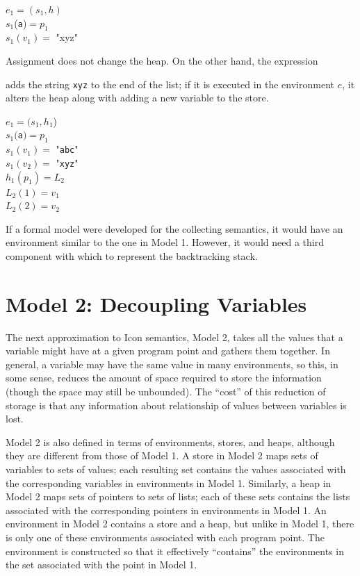 \goodbreak
\begin{iconcode}
\>$e_1 = (s_1 , h)$\\
\>$s_1$(\texttt{a})$ = p_1$\\
\>$s_1(v_1) =$ "xyz"\\
\end{iconcode}

\noindent
Assignment does not change the heap. On the other hand, the expression 


\noindent adds the string \texttt{xyz} to the end of the list; if it is
executed in the environment $e$, it alters the heap along with adding a
new variable to the store.

\goodbreak
\begin{specialcode}{}
\>$e_1 = (s_1 , h_1$)\\
\>$s_1($\texttt{a}$) = p_1$\\
\>$s_1(v_1) =$ "\texttt{abc}"\\
\>$s_1(v_2) =$ "\texttt{xyz}"\\
\>$h_1(p_1) = L_2$\\
\>$L_2(1) = v_1$\\
\>$L_2(2) = v_2$\\
\end{specialcode}


If a formal model were developed for the collecting semantics, it
would have an environment similar to the one in Model 1. However, it
would need a third component with which to represent the backtracking
stack.

\section*{Model 2: Decoupling Variables}

The next approximation to Icon semantics, Model 2, takes all the
values that a variable might have at a given program point and gathers
them together. In general, a variable may have the same value in many
environments, so this, in some sense, reduces the amount of space
required to store the information (though the space may still be
unbounded). The ``cost'' of this reduction of storage is that any
information about relationship of values between variables is lost.

Model 2 is also defined in terms of environments, stores, and heaps,
although they are different from those of Model 1.  A store in Model 2
maps sets of variables to sets of values; each resulting set contains
the values associated with the corresponding variables in environments
in Model 1. Similarly, a heap in Model 2 maps sets of pointers to sets
of lists; each of these sets contains the lists associated with the
corresponding pointers in environments in Model 1. An environment in
Model 2 contains a store and a heap, but unlike in Model 1, there is
only one of these environments associated with each program point. The
environment is constructed so that it effectively ``contains'' the
environments in the set associated with the point in Model 1.

